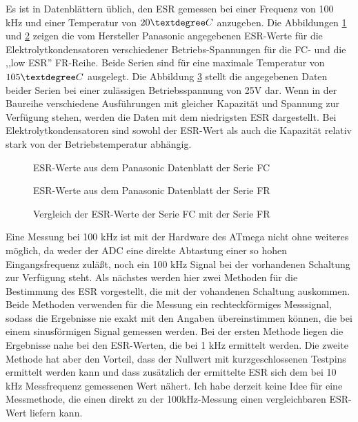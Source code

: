 Es ist in Datenblättern üblich, den ESR gemessen bei einer Frequenz von 100 kHz und
einer Temperatur von \(20\textdegree C\) anzugeben.
Die Abbildungen \ref{fig:Cap_FC_data} und \ref{fig:Cap_FR_data} zeigen die vom Hersteller Panasonic 
angegebenen ESR-Werte für die Elektrolytkondensatoren verschiedener Betriebs-Spannungen für die FC- und die ,,low ESR'' FR-Reihe.
Beide Serien sind für eine maximale Temperatur von \(105\textdegree C\) ausgelegt.
Die Abbildung \ref{fig:Cap_FC_FR_data} stellt die angegebenen Daten beider Serien bei einer zulässigen Betriebsspannung
von 25V dar. Wenn in der Baureihe verschiedene Ausführungen mit gleicher Kapazität und Spannung zur Verfügung stehen,
werden die Daten mit dem niedrigsten ESR dargestellt.
Bei Elektrolytkondensatoren sind sowohl der ESR-Wert als auch die Kapazität relativ stark von der Betriebstemperatur
abhängig.

\begin{figure}[H]
  \centering
    \resizebox{14cm}{!}{}
  \caption{ESR-Werte aus dem Panasonic Datenblatt der Serie FC}
  \label{fig:Cap_FC_data}
\end{figure}

\begin{figure}[H]
  \centering
    \resizebox{14cm}{!}{}
  \caption{ESR-Werte aus dem Panasonic Datenblatt der Serie FR}
  \label{fig:Cap_FR_data}
\end{figure}

\begin{figure}[H]
  \centering
    \resizebox{14cm}{!}{}
  \caption{Vergleich der ESR-Werte der Serie FC mit der Serie FR}
  \label{fig:Cap_FC_FR_data}
\end{figure}

Eine Messung bei 100 kHz ist mit der Hardware des ATmega nicht ohne weiteres möglich, da weder der ADC
eine direkte Abtastung einer so hohen Eingangsfrequenz zuläßt, noch ein 100 kHz Signal bei der vorhandenen Schaltung zur
Verfügung steht. 
Als nächstes werden hier zwei Methoden für die Bestimmung des ESR vorgestellt, die mit der vohandenen
Schaltung auskommen. 
Beide Methoden verwenden für die Messung ein rechteckförmiges Messsignal, sodass die Ergebnisse nie
exakt mit den Angaben übereinstimmen können, die bei einem sinusförmigen Signal gemessen werden.
Bei der ersten Methode liegen die Ergebnisse nahe bei den ESR-Werten, die bei 1 kHz ermittelt werden.
Die zweite Methode hat aber den Vorteil, dass der Nullwert mit kurzgeschlossenen Testpins ermittelt werden kann
und dass zusätzlich der ermittelte ESR sich dem bei 10 kHz Messfrequenz gemessenen Wert nähert.
Ich habe derzeit keine Idee für eine Messmethode, die einen direkt zu der 100kHz-Messung einen 
vergleichbaren ESR-Wert liefern kann.

